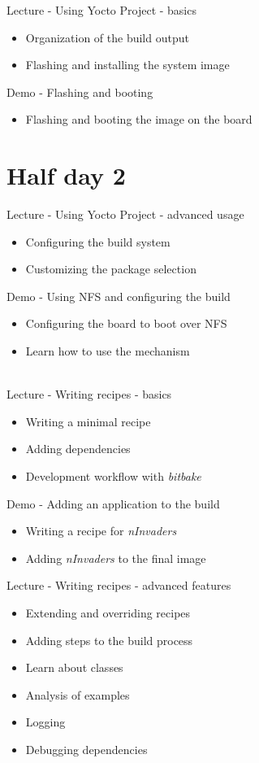 \documentclass[a4paper,12pt,obeyspaces,spaces,hyphens]{article}
\begin{document}
\newpage
\feagendaonecolumn
{Lecture - Using Yocto Project - basics}
{
  \begin{itemize}
  \item Organization of the build output
  \item Flashing and installing the system image
  \end{itemize}
}

\feagendaonecolumn
{Demo - Flashing and booting}
{
  \begin{itemize}
  \item Flashing and booting the image on the board
  \end{itemize}
}

\section{Half day 2}

\feagendatwocolumn
{Lecture - Using Yocto Project - advanced usage}
{
  \begin{itemize}
  \item Configuring the build system
  \item Customizing the package selection
  \end{itemize}
}
{Demo - Using NFS and configuring the build}
{
  \begin{itemize}
  \item Configuring the board to boot over NFS
  \item Learn how to use the  mechanism
  \end{itemize}
}
\\

\feagendatwocolumn
{Lecture - Writing recipes - basics}
{
  \begin{itemize}
  \item Writing a minimal recipe
  \item Adding dependencies
  \item Development workflow with {\em bitbake}
  \end{itemize}
}
{Demo - Adding an application to the build}
{
  \begin{itemize}
  \item Writing a recipe for {\em nInvaders}
  \item Adding {\em nInvaders} to the final image
  \end{itemize}
}

\feagendaonecolumn
{Lecture - Writing recipes - advanced features}
{
  \begin{itemize}
  \item Extending and overriding recipes
  \item Adding steps to the build process
  \item Learn about classes
  \item Analysis of examples
  \item Logging
  \item Debugging dependencies
  \end{itemize}
}
\end{document}
